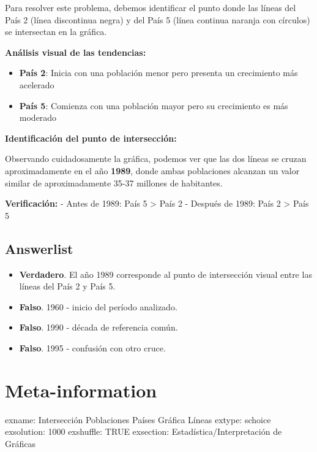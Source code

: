 \documentclass[
]{article}
\providecommand{\tightlist}{%
  \setlength{\itemsep}{0pt}\setlength{\parskip}{0pt}}
\begin{document}
Para resolver este problema, debemos identificar el punto donde las
líneas del País 2 (línea discontinua negra) y del País 5 (línea continua
naranja con círculos) se intersectan en la gráfica.

\textbf{Análisis visual de las tendencias:}

\begin{itemize}
\tightlist
\item
  \textbf{País 2}: Inicia con una población menor pero presenta un
  crecimiento más acelerado
\item
  \textbf{País 5}: Comienza con una población mayor pero su crecimiento
  es más moderado
\end{itemize}

\textbf{Identificación del punto de intersección:}

Observando cuidadosamente la gráfica, podemos ver que las dos líneas se
cruzan aproximadamente en el año \textbf{1989}, donde ambas poblaciones
alcanzan un valor similar de aproximadamente 35-37 millones de
habitantes.

\textbf{Verificación:} - Antes de 1989: País 5 \textgreater{} País 2 -
Después de 1989: País 2 \textgreater{} País 5

\subsection{Answerlist}\label{answerlist-1}

\begin{itemize}
\tightlist
\item
  \textbf{Verdadero}. El año 1989 corresponde al punto de intersección
  visual entre las líneas del País 2 y País 5.
\item
  \textbf{Falso}. 1960 - inicio del período analizado.
\item
  \textbf{Falso}. 1990 - década de referencia común.
\item
  \textbf{Falso}. 1995 - confusión con otro cruce.
\end{itemize}

\section{Meta-information}\label{meta-information}

exname: Intersección Poblaciones Países Gráfica Líneas extype: schoice
exsolution: 1000 exshuffle: TRUE exsection: Estadística/Interpretación
de Gráficas
\end{document}
